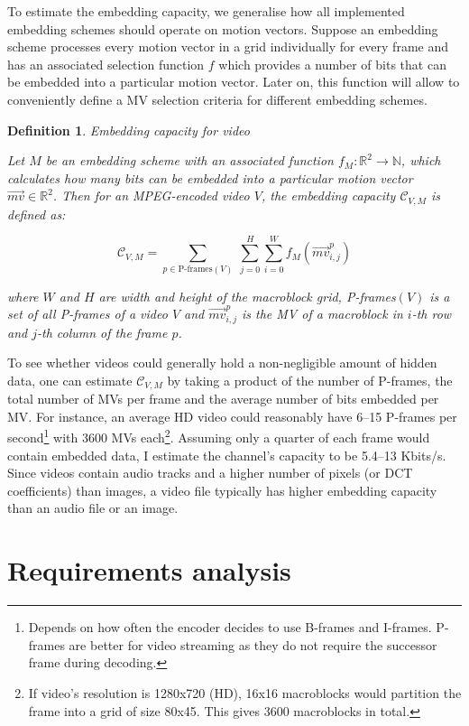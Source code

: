 \documentclass[12pt,british,twoside,notitlepage,usenames,dvipsnames,hypens,final]{report}
\newtheorem{definition}{Definition}
\numberwithin{equation}{section}
\numberwithin{figure}{section}
\begin{document}
To estimate the embedding capacity, we generalise how all implemented embedding schemes should operate on motion vectors. Suppose an embedding scheme processes every motion vector in a grid individually for every frame and has an associated selection function $f$ which provides a number of bits that can be embedded into a particular motion vector. Later on, this function will allow to conveniently define a MV selection criteria for different embedding schemes.

\begin{definition}{Embedding capacity for video}

Let $M$ be an embedding scheme with an associated function $f_M : \mathbb{R}^2 \rightarrow \mathbb{N}$, which calculates how many bits can be embedded into a particular motion vector $\overrightarrow{mv} \in \mathbb{R}^2$. Then for an MPEG-encoded video $V$, the embedding capacity $\mathcal{C}_{V, M}$ is defined as:

$$ \mathcal{C}_{V, M} = \sum_{p \in \text{P-frames}(V)} \: \sum^{H}_{j = 0} \sum^{W}_{i = 0} f_M(\overrightarrow{mv}^p_{i, j})$$

where $W$ and $H$ are width and height of the macroblock grid, P-frames$(V)$ is a set of all P-frames of a video $V$ and $\overrightarrow{mv}^p_{i, j}$ is the MV of a macroblock  in $i$-th row and $j$-th column of the frame $p$.

\end{definition}

To see whether videos could generally hold a non-negligible amount of hidden data, one can estimate $\mathcal{C}_{V, M}$ by taking a product of the number of P-frames, the total number of MVs per frame and the average number of bits embedded per MV. For instance, an average HD video could reasonably have 6--15 P-frames per second\footnote{Depends on how often the encoder decides to use B-frames and I-frames. P-frames are better for video streaming as they do not require the successor frame during decoding.} with 3600 MVs each\footnote{If video's resolution is 1280x720 (HD), 16x16 macroblocks would partition the frame into a grid of size 80x45. This gives 3600 macroblocks in total.}. Assuming only a quarter of each frame would contain embedded data, I estimate the channel's capacity to be 5.4--13 Kbits/s. Since videos contain audio tracks and a higher number of pixels (or DCT coefficients) than images, a video file typically has higher embedding capacity than an audio file or an image.

\section{Requirements analysis}
\end{document}
